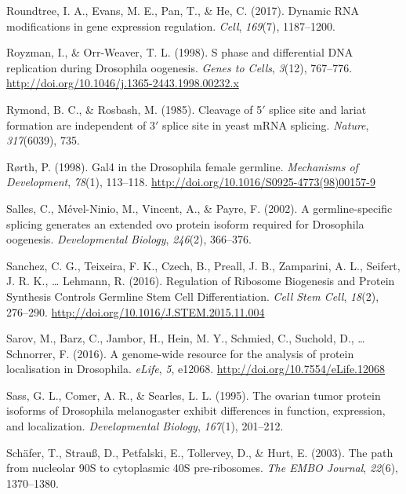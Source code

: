 \documentclass[12pt,twoside]{reedthesis}
\newlength{\cslhangindent}
\newenvironment{cslreferences}%
  {\setlength{\parindent}{0pt}%
  \everypar{\setlength{\hangindent}{\cslhangindent}}\ignorespaces}%
  {\par}
\begin{document}
\begin{cslreferences}
\leavevmode\hypertarget{ref-Roundtree2017}{}%
Roundtree, I. A., Evans, M. E., Pan, T., \& He, C. (2017). Dynamic RNA modifications in gene expression regulation. \emph{Cell}, \emph{169}(7), 1187--1200.

\leavevmode\hypertarget{ref-Royzman1998}{}%
Royzman, I., \& Orr-Weaver, T. L. (1998). S phase and differential DNA replication during Drosophila oogenesis. \emph{Genes to Cells}, \emph{3}(12), 767--776. \url{http://doi.org/10.1046/j.1365-2443.1998.00232.x}

\leavevmode\hypertarget{ref-Rymond1985}{}%
Rymond, B. C., \& Rosbash, M. (1985). Cleavage of 5\({'}\) splice site and lariat formation are independent of 3\({'}\) splice site in yeast mRNA splicing. \emph{Nature}, \emph{317}(6039), 735.

\leavevmode\hypertarget{ref-rorthGal4DrosophilaFemale1998}{}%
Rørth, P. (1998). Gal4 in the Drosophila female germline. \emph{Mechanisms of Development}, \emph{78}(1), 113--118. \url{http://doi.org/10.1016/S0925-4773(98)00157-9}

\leavevmode\hypertarget{ref-Salles2002}{}%
Salles, C., Mével-Ninio, M., Vincent, A., \& Payre, F. (2002). A germline-specific splicing generates an extended ovo protein isoform required for Drosophila oogenesis. \emph{Developmental Biology}, \emph{246}(2), 366--376.

\leavevmode\hypertarget{ref-Sanchez2016h}{}%
Sanchez, C. G., Teixeira, F. K., Czech, B., Preall, J. B., Zamparini, A. L., Seifert, J. R. K., \ldots{} Lehmann, R. (2016). Regulation of Ribosome Biogenesis and Protein Synthesis Controls Germline Stem Cell Differentiation. \emph{Cell Stem Cell}, \emph{18}(2), 276--290. \url{http://doi.org/10.1016/J.STEM.2015.11.004}

\leavevmode\hypertarget{ref-sarovGenomewideResourceAnalysis2016}{}%
Sarov, M., Barz, C., Jambor, H., Hein, M. Y., Schmied, C., Suchold, D., \ldots{} Schnorrer, F. (2016). A genome-wide resource for the analysis of protein localisation in Drosophila. \emph{eLife}, \emph{5}, e12068. \url{http://doi.org/10.7554/eLife.12068}

\leavevmode\hypertarget{ref-Sass1995}{}%
Sass, G. L., Comer, A. R., \& Searles, L. L. (1995). The ovarian tumor protein isoforms of Drosophila melanogaster exhibit differences in function, expression, and localization. \emph{Developmental Biology}, \emph{167}(1), 201--212.

\leavevmode\hypertarget{ref-Schafer2003a}{}%
Schäfer, T., Strauß, D., Petfalski, E., Tollervey, D., \& Hurt, E. (2003). The path from nucleolar 90S to cytoplasmic 40S pre-ribosomes. \emph{The EMBO Journal}, \emph{22}(6), 1370--1380.


\end{cslreferences}
\end{document}
